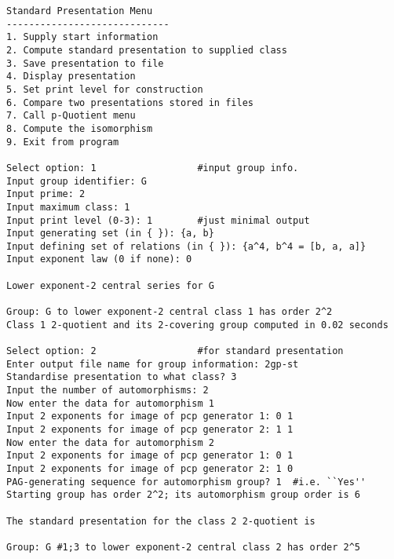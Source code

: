 \documentclass[12pt]{article}
\begin{document}
\begin{verbatim}
Standard Presentation Menu
-----------------------------
1. Supply start information
2. Compute standard presentation to supplied class
3. Save presentation to file
4. Display presentation
5. Set print level for construction
6. Compare two presentations stored in files
7. Call p-Quotient menu
8. Compute the isomorphism
9. Exit from program

Select option: 1                  #input group info.
Input group identifier: G
Input prime: 2
Input maximum class: 1
Input print level (0-3): 1        #just minimal output
Input generating set (in { }): {a, b}
Input defining set of relations (in { }): {a^4, b^4 = [b, a, a]}
Input exponent law (0 if none): 0

Lower exponent-2 central series for G

Group: G to lower exponent-2 central class 1 has order 2^2
Class 1 2-quotient and its 2-covering group computed in 0.02 seconds

Select option: 2                  #for standard presentation
Enter output file name for group information: 2gp-st
Standardise presentation to what class? 3
Input the number of automorphisms: 2
Now enter the data for automorphism 1
Input 2 exponents for image of pcp generator 1: 0 1
Input 2 exponents for image of pcp generator 2: 1 1
Now enter the data for automorphism 2
Input 2 exponents for image of pcp generator 1: 0 1
Input 2 exponents for image of pcp generator 2: 1 0
PAG-generating sequence for automorphism group? 1  #i.e. ``Yes''
Starting group has order 2^2; its automorphism group order is 6 

The standard presentation for the class 2 2-quotient is

Group: G #1;3 to lower exponent-2 central class 2 has order 2^5

Non-trivial powers:
 .1^2 = .4
 .2^2 = .5

Non-trivial commutators:
[ .2, .1 ] = .3
Its automorphism group has order 384
Computing standard presentation for class 2 took 0.08 seconds

The standard presentation for the class 3 2-quotient is

Group: G #1;3 to lower exponent-2 central class 3 has order 2^8

Non-trivial powers:
 .1^2 = .4
 .2^2 = .5
 .3^2 = .6 .8
 .5^2 = .6

Non-trivial commutators:
[ .2, .1 ] = .3
[ .3, .1 ] = .6
[ .3, .2 ] = .7
[ .4, .2 ] = .8
[ .5, .1 ] = .6 .7 .8
Its automorphism group has order 4096
Computing standard presentation for class 3 took 0.12 seconds

Select option: 0           #exit (option 9 does this also)
\end{verbatim}
\end{document}
